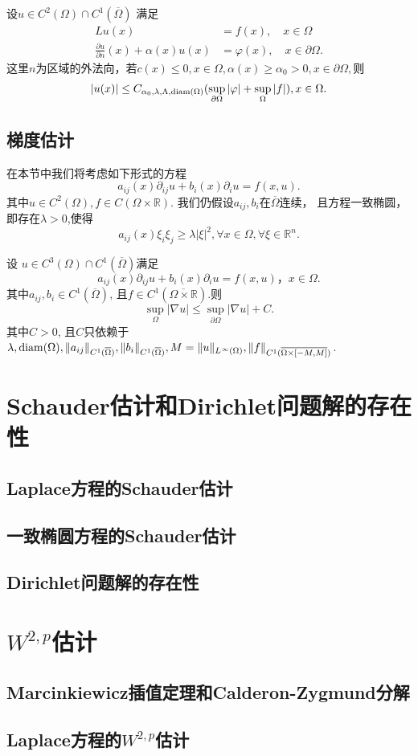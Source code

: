 \begin{proposition}
    设$u\in C^2(\Omega)\cap C^1(\overline{\Omega})$ 满足 
\begin{align*}
    Lu(x)&=f(x),\quad x\in \Omega\\
    \frac{\partial u}{\partial n}(x)+\alpha (x)u(x) &=\varphi(x),
    \quad x\in \partial \Omega.
 \end{align*} 
这里$n$为区域的外法向，若$c(x)\leq 0,x\in \Omega,
\alpha (x)\geq \alpha_0>0,x\in \partial \Omega,$则 
$$\vert u(x)\vert \leq C_{\alpha_0,\lambda ,\Lambda,\operatorname{diam}(\Omega)}
(\sup_{\partial \Omega}\vert \varphi\vert +\sup_{\Omega}\vert f\vert ),x\in \Omega.$$
\end{proposition} 

\subsection{梯度估计}

在本节中我们将考虑如下形式的方程
$$a_{ij}(x)\partial_{ij}u+b_i(x)\partial_iu=f(x,u).$$
其中$u\in C^2(\Omega),f\in C(\Omega\times\mathbb{R})$.
我们仍假设$a_{ij},b_i$在$\overline{\Omega}$连续，
且方程一致椭圆，即存在$\lambda>0$,使得
$$a_{ij}(x)\xi_i\xi_j\geq \lambda \vert \xi\vert ^2,
\forall x\in \Omega, \forall \xi \in \mathbb{R}^n.$$

\begin{proposition}
    设 $u\in C^3(\Omega)\cap C^1(\overline{\Omega})$满足
$$a_{ij}(x)\partial_{ij}u+b_i(x)\partial_iu=f(x,u)，x\in \Omega.$$
其中$a_{ij},b_i\in C^1(\overline{\Omega})$,
且$f\in C^1(\overline{\Omega\times \mathbb{R}})$.则 
$$\sup_{\Omega}\vert \nabla u\vert 
\leq \sup_{\partial\Omega}\vert \nabla u\vert +C.$$
其中$C>0$, 且$C$只依赖于 $\lambda,\operatorname{diam}(\Omega),
\Vert a_{ij}\Vert_{C^1(\overline{\Omega})},
\Vert b_i\Vert _{C^1(\overline{\Omega})},M=\Vert u\Vert _{L^\infty(\Omega)},
\Vert f \Vert_{C^1(\overline{\Omega\times [-M,M]})}$.
\end{proposition}

\section{Schauder估计和Dirichlet问题解的存在性}
\subsection{Laplace方程的Schauder估计}
\subsection{一致椭圆方程的Schauder估计}
\subsection{Dirichlet问题解的存在性}

\section{$W^{2,p}$估计}
\subsection{Marcinkiewicz插值定理和Calderon-Zygmund分解}
\subsection{Laplace方程的$W^{2,p}$估计}